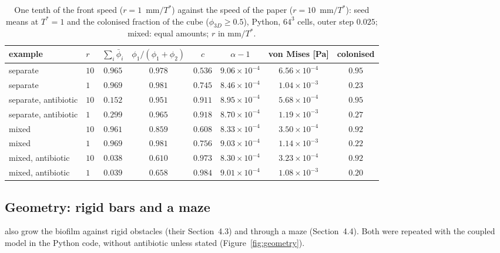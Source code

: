 \documentclass[11pt,a4paper]{article}
\newcommand{\phiD}{\phi_{3D}}
\newcommand{\lv}{\textstyle\sum_i\bar\phi_i}
\begin{document}
\begin{table}[tbp]
  \centering
  \caption{One tenth of the front speed ($r=1$~mm$/T^*$) against the speed of the paper ($r=10$~mm$/T^*$): seed means at $T^*=1$ and the colonised fraction of the cube ($\phiD\ge0.5$), Python, $64^3$ cells, outer step $0.025$; mixed: equal amounts; $r$ in mm$/T^*$.}
  \label{tab:slowfront}
  \footnotesize
  \setlength{\tabcolsep}{3pt}
  \begin{tabular}{llcccccc}
    \toprule
    example & $r$ & $\lv$ & $\phi_1/(\phi_1+\phi_2)$ & $c$ & $\alpha-1$ & von Mises [Pa] & colonised \\
    \midrule
    separate & $10$ & $0.965$ & $0.978$ & $0.536$ & $9.06\times10^{-4}$ & $6.56\times10^{-4}$ & $0.95$ \\
    separate & $1$ & $0.969$ & $0.981$ & $0.745$ & $8.46\times10^{-4}$ & $1.04\times10^{-3}$ & $0.23$ \\
    separate, antibiotic & $10$ & $0.152$ & $0.951$ & $0.911$ & $8.95\times10^{-4}$ & $5.68\times10^{-4}$ & $0.95$ \\
    separate, antibiotic & $1$ & $0.299$ & $0.965$ & $0.918$ & $8.70\times10^{-4}$ & $1.19\times10^{-3}$ & $0.27$ \\
    mixed & $10$ & $0.961$ & $0.859$ & $0.608$ & $8.33\times10^{-4}$ & $3.50\times10^{-4}$ & $0.92$ \\
    mixed & $1$ & $0.969$ & $0.981$ & $0.756$ & $9.03\times10^{-4}$ & $1.14\times10^{-3}$ & $0.22$ \\
    mixed, antibiotic & $10$ & $0.038$ & $0.610$ & $0.973$ & $8.30\times10^{-4}$ & $3.23\times10^{-4}$ & $0.92$ \\
    mixed, antibiotic & $1$ & $0.039$ & $0.658$ & $0.984$ & $9.01\times10^{-4}$ & $1.08\times10^{-3}$ & $0.20$ \\
    \bottomrule
  \end{tabular}
\end{table}

\subsection{Geometry: rigid bars and a maze}
\label{sec:geometry}

\citet{Klempt2024DiffusionDrivenGrowth} also grow the biofilm against rigid obstacles (their Section~4.3) and through a maze (Section~4.4). Both were repeated with the coupled model in the Python code, without antibiotic unless stated (Figure~\ref{fig:geometry}).
\end{document}
